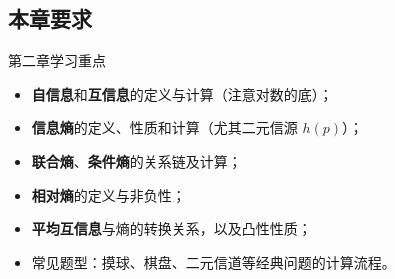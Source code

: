 \subsection{本章要求}
\begin{remarkBox}{第二章学习重点}
\begin{itemize}
  \item \textbf{自信息}和\textbf{互信息}的定义与计算（注意对数的底）；
  \item \textbf{信息熵}的定义、性质和计算（尤其二元信源 $h(p)$）；
  \item \textbf{联合熵}、\textbf{条件熵}的关系链及计算；
  \item \textbf{相对熵}的定义与非负性；
  \item \textbf{平均互信息}与熵的转换关系，以及凸性性质；
  \item 常见题型：摸球、棋盘、二元信道等经典问题的计算流程。
\end{itemize}
\end{remarkBox}
